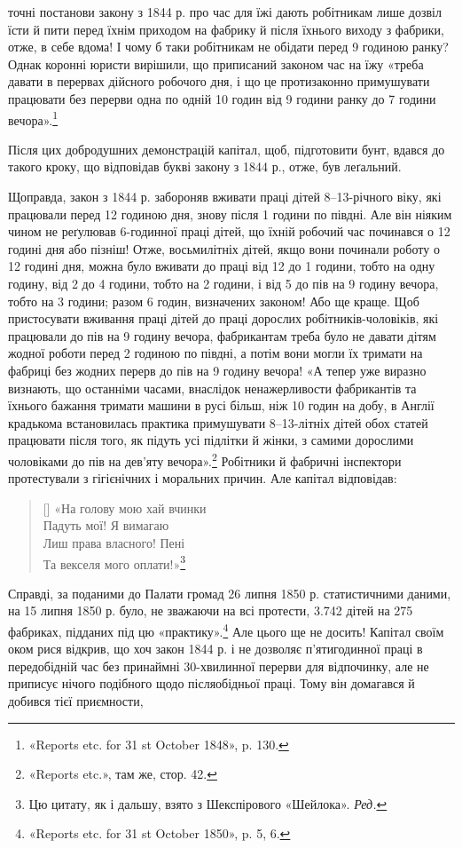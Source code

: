 \parcont{}  %
точні постанови закону з 1844 р. про час для їжі дають робітникам
лише дозвіл їсти й пити перед їхнім приходом на фабрику
й після їхнього виходу з фабрики, отже, в себе вдома! І чому б
таки робітникам не обідати перед 9 годиною ранку? Однак коронні
юристи вирішили, що приписаний законом час на їжу «треба
давати в перервах дійсного робочого дня, і що це протизаконно
примушувати працювати без перерви одна по одній 10 годин
від 9 години ранку до 7 години вечора».\footnote{
«Reports etc. for 31 st October 1848», p. 130.
}

Після цих добродушних демонстрацій капітал, щоб, підготовити
бунт, вдався до такого кроку, що відповідав букві закону
з 1844 р., отже, був леґальний.

Щоправда, закон з 1844 р. забороняв вживати праці дітей 8--13-річного
віку, які працювали перед 12 годиною дня, знову після
1 години по півдні. Але він ніяким чином не реґулював 6-годинної
праці дітей, що їхній робочий час починався о 12 годині
дня або пізніш! Отже, восьмилітніх дітей, якщо вони починали
роботу о 12 годині дня, можна було вживати до праці від 12 до
1 години, тобто на одну годину, від 2 до 4 години, тобто на 2 години,
і від 5 до пів на 9 годину вечора, тобто на 3 години; разом
6 годин, визначених законом! Або ще краще. Щоб пристосувати
вживання праці дітей до праці дорослих робітників-чоловіків, які
працювали до пів на 9 годину вечора, фабрикантам треба було не
давати дітям жодної роботи перед 2 годиною по півдні, а потім вони
могли їх тримати на фабриці без жодних перерв до пів на 9 годину
вечора! «А тепер уже виразно визнають, що останніми часами,
внаслідок ненажерливости фабрикантів та їхнього бажання тримати
машини в русі більш, ніж 10 годин на добу, в Англії крадькома
встановилась практика примушувати 8--13-літніх дітей
обох статей працювати після того, як підуть усі підлітки й жінки,
з самими дорослими чоловіками до пів на дев’яту вечора».\footnote{
«Reports etc.», там же, стор. 42.
}
Робітники й фабричні інспектори протестували з гігієнічних і
моральних причин. Але капітал відповідав:

\settowidth{\versewidth}{«На голову мою хай вчинки}
\begin{verse}[\versewidth]
«На голову мою хай вчинки \\
Падуть мої! Я вимагаю \\
Лиш права власного! Пені \\
Та векселя мого оплати!»\footnote*{
Цю цитату, як і дальшу, взято з Шекспірового «Шейлока». \emph{Ред.}
}
\end{verse}

Справді, за поданими до Палати громад 26 липня 1850 р.
статистичними даними, на 15 липня 1850 р. було, не зважаючи
на всі протести, 3.742 дітей на 275 фабриках, підданих під цю
«практику».\footnote{
«Reports etc. for 31 st October 1850», p. 5, 6.
} Але цього ще не досить! Капітал своїм оком
рися відкрив, що хоч закон 1844 р. і не дозволяє п’ятигодинної
праці в передобідній час без принаймні 30-хвилинної перерви
для відпочинку, але не приписує нічого подібного щодо післяобідньої
праці. Тому він домагався й добився тієї приємности,
\parbreak{}  %
